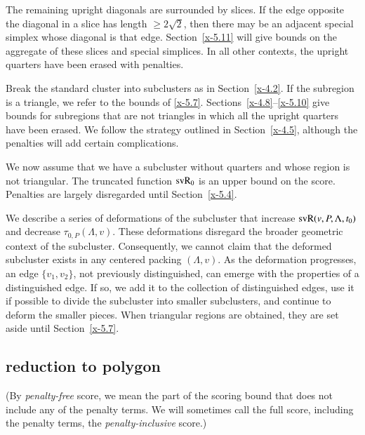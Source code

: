 The remaining upright diagonals are surrounded by slices. If
the edge opposite the diagonal in a slice has length
$\ge2\sqrt2$, then there may be an adjacent special simplex whose
diagonal is that edge.  Section~\ref{x-5.11} will give bounds on the
aggregate of these slices and special simplices.  In all
other contexts, the upright quarters have been erased with penalties.

Break the standard cluster into subclusters as in Section~\ref{x-4.2}.
If the subregion is a triangle, we refer to the bounds of \ref{x-5.7}.
Sections~\ref{x-4.8}--\ref{x-5.10} give bounds for subregions that are
not triangles in which all the upright quarters have been erased. We
follow the strategy outlined in Section~\ref{x-4.5}, although the
penalties will add certain complications.

We now assume that we have a subcluster without quarters and whose
region is not triangular.  The truncated function ${\operatorname{svR}}_0$ is an
upper bound on the score.  Penalties are largely disregarded until
Section~\ref{x-5.4}.

We describe a series of deformations of the subcluster that
increase ${\operatorname{svR}}(v,P,\Lambda,t_0)$ and decrease $\tau_{0,P}(\Lambda,v)$.  These
deformations disregard the broader geometric context of the
subcluster. Consequently, we cannot claim that the deformed
subcluster exists in any centered packing $(\Lambda,v)$.  As the deformation
progresses, an edge $\{v_1,v_2\}$, not previously distinguished,
can emerge with the properties of a distinguished edge. If so, we
add it to the collection of distinguished edges, use it if
possible to divide the subcluster into smaller subclusters, and
continue to deform the smaller pieces.  When triangular regions
are obtained, they are set aside until Section~\ref{x-5.7}.

\subsection{reduction to polygon} %





\begin{definition}
(By {\it penalty-free\/} score, we mean the part of the scoring
bound that does not include any of the penalty terms.  We will
sometimes call the full score, including the penalty terms, the
{\it penalty-inclusive\/} score.)
\end{definition}

